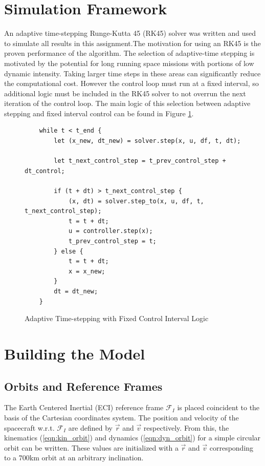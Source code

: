 \documentclass{article}
\begin{document}
\section{Simulation Framework}

An adaptive time-stepping Runge-Kutta 45 (RK45) solver was written and used to simulate all results in this assignment.The motivation for using an RK45 is the proven performance of the algorithm. The selection of adaptive-time stepping is motivated by the potential for long running space missions with portions of low dynamic intensity. Taking larger time steps in these areas can significantly reduce the computational cost. However the control loop must run at a fixed interval, so additional logic must be included in the RK45 solver to not overrun the next iteration of the control loop. The main logic of this selection between adaptive stepping and fixed interval control can be found in Figure \ref{fig:main_loop}.

\begin{figure}[h]
	\begin{verbatim}
    while t < t_end {
        let (x_new, dt_new) = solver.step(x, u, df, t, dt);

        let t_next_control_step = t_prev_control_step + dt_control;

        if (t + dt) > t_next_control_step {
            (x, dt) = solver.step_to(x, u, df, t, t_next_control_step);
            t = t + dt;
            u = controller.step(x);
            t_prev_control_step = t;
        } else {
            t = t + dt;
            x = x_new;
        }
        dt = dt_new;
    }
	\end{verbatim}
	\caption{Adaptive Time-stepping with Fixed Control Interval Logic}
	\label{fig:main_loop}
\end{figure}

\section{Building the Model}

\subsection{Orbits and Reference Frames}

The Earth Centered Inertial (ECI) reference frame $\mathcal{F}_I$ is placed coincident to the basis of the Cartesian coordinates system. The position and velocity of the spacecraft w.r.t. $\mathcal{F}_I$ are defined by $\vec{r}$ and $\vec{v}$ respectively. From this, the kinematics (\ref{eqn:kin_orbit}) and dynamics (\ref{eqn:dyn_orbit}) for a simple circular orbit can be written. These values are initialized with a $\vec{r}$ and $\vec{v}$ corresponding to a 700km orbit at an arbitrary inclination.
\end{document}
